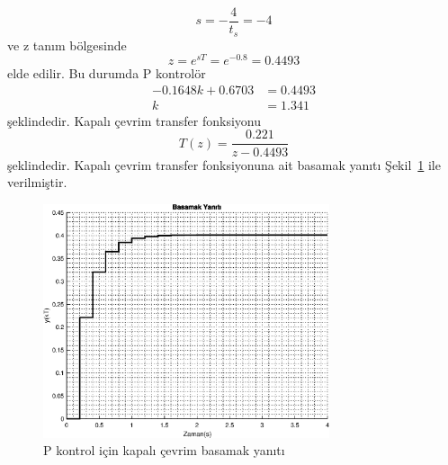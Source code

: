 \begin{equation}
    s=-\frac{4}{t_s}=-4
\end{equation}
ve z tanım bölgesinde
\begin{equation}
    z=e^{sT}=e^{-0.8}=0.4493
\end{equation}
elde edilir. Bu durumda P kontrolör
\begin{equation}
\begin{split}
    -0.1648k+0.6703&=0.4493\\
    k&=1.341
\end{split}
\end{equation}
şeklindedir. Kapalı çevrim transfer fonksiyonu
\begin{equation}
    T(z)=\frac{0.221}{z - 0.4493}
\end{equation}
şeklindedir. Kapalı çevrim transfer fonksiyonuna ait basamak yanıtı Şekil~\ref{fig:lec6_step1} ile verilmiştir.
\begin{figure}[!htb]
    \centering
    \includegraphics[width=0.75\textwidth]{img/lec6_step1}
    \caption{P kontrol için kapalı çevrim basamak yanıtı}
    \label{fig:lec6_step1}
\end{figure}

